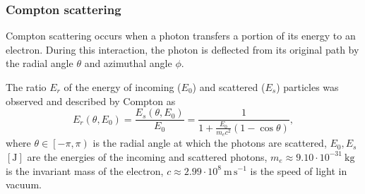 \documentclass[a4paper,11pt,titlepage,twoside]{article}
\newcommand{\unit}[2]{$#1~\ensuremath{\mathrm{#2}}$}
\begin{document}

\subsubsection*{Compton scattering}


Compton scattering occurs when a photon transfers a portion of its energy to an electron.
During this interaction, the photon is deflected from its original path by the radial angle $\theta$ and azimuthal angle $\phi$.

The ratio $E_r$ of the energy of incoming ($E_{0}$) and scattered ($E_{s}$) particles was observed and described by Compton as
\begin{equation}
  E_r\left(\theta, E_0\right) = \frac{E_s\left(\theta, E_0\right)}{E_{0}} = \frac{1}{1 + \frac{E_0}{m_ec^2}\left(1 - \cos\theta\right)},
\end{equation}
where $\theta \in \left[-\pi, \pi\right)$ is the radial angle at which the photons are scattered, $E_0, E_s$ $\left[\mathrm{J}\right]$ are the energies of the incoming and scattered photons, \unit{m_e \approx 9.10 \cdot 10^{-31}}{kg} is the invariant mass of the electron, \unit{c \approx 2.99 \cdot 10^{8}}{m\,s^{-1}} is the speed of light in vacuum.
\end{document}
